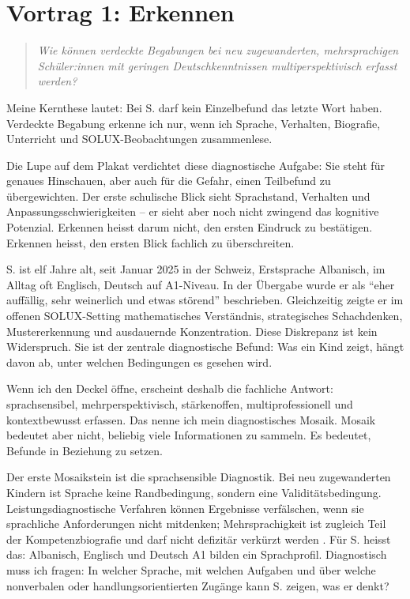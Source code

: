 \documentclass[ngerman, a4paper]{article}
\begin{document}
\section{Vortrag 1: Erkennen}
\label{sec:vortrag1}

\begin{quote}\itshape
Wie können verdeckte Begabungen bei neu zugewanderten, mehrsprachigen
Schüler:innen mit geringen Deutschkenntnissen multiperspektivisch erfasst
werden?
\end{quote}

Meine Kernthese lautet: Bei S. darf kein Einzelbefund das letzte Wort haben.
Verdeckte Begabung erkenne ich nur, wenn ich Sprache, Verhalten, Biografie,
Unterricht und SOLUX-Beobachtungen zusammenlese.

Die Lupe auf dem Plakat verdichtet diese diagnostische Aufgabe: Sie steht für
genaues Hinschauen, aber auch für die Gefahr, einen Teilbefund zu übergewichten.
Der erste schulische Blick sieht Sprachstand, Verhalten und
Anpassungsschwierigkeiten -- er sieht aber noch nicht zwingend das kognitive
Potenzial. Erkennen heisst darum nicht, den ersten Eindruck zu bestätigen.
Erkennen heisst, den ersten Blick fachlich zu überschreiten.

S. ist elf Jahre alt, seit Januar 2025 in der Schweiz, Erstsprache Albanisch, im
Alltag oft Englisch, Deutsch auf A1-Niveau. In der Übergabe wurde er als
\enquote{eher auffällig, sehr weinerlich und etwas störend} beschrieben.
Gleichzeitig zeigte er im offenen SOLUX-Setting mathematisches Verständnis,
strategisches Schachdenken, Mustererkennung und ausdauernde Konzentration. Diese
Diskrepanz ist kein Widerspruch. Sie ist der zentrale diagnostische Befund: Was
ein Kind zeigt, hängt davon ab, unter welchen Bedingungen es gesehen wird.

Wenn ich den Deckel öffne, erscheint deshalb die fachliche Antwort:
sprachsensibel, mehrperspektivisch, stärkenoffen, multiprofessionell und
kontextbewusst erfassen. Das nenne ich mein diagnostisches Mosaik. Mosaik
bedeutet aber nicht, beliebig viele Informationen zu sammeln. Es bedeutet,
Befunde in Beziehung zu setzen.

Der erste Mosaikstein ist die sprachsensible Diagnostik. Bei neu zugewanderten
Kindern ist Sprache keine Randbedingung, sondern eine Validitätsbedingung.
Leistungsdiagnostische Verfahren können Ergebnisse verfälschen, wenn sie
sprachliche Anforderungen nicht mitdenken; Mehrsprachigkeit ist zugleich Teil
der Kompetenzbiografie und darf nicht defizitär verkürzt werden
\parencites{haag2018leistungsstanddiagnostik}{maehler2018diagnostik}. Für S.
heisst das: Albanisch, Englisch und Deutsch A1 bilden ein Sprachprofil.
Diagnostisch muss ich fragen: In welcher Sprache, mit welchen Aufgaben und über
welche nonverbalen oder handlungsorientierten Zugänge kann S. zeigen, was er
denkt?
\end{document}
